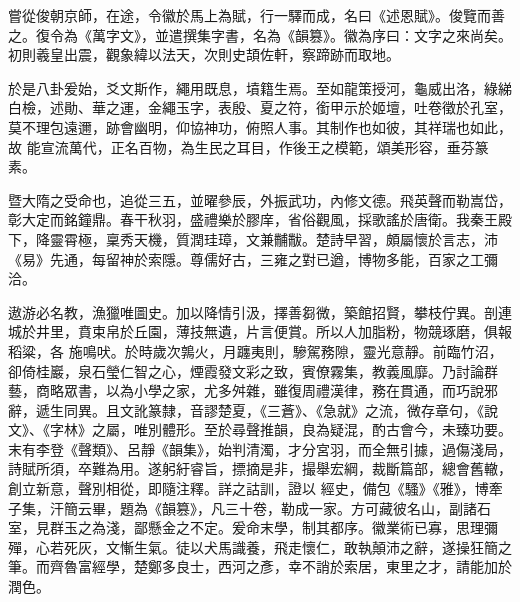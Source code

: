 \begin{pinyinscope}
 嘗從俊朝京師，在途，令徽於馬上為賦，行一驛而成，名曰《述恩賦》。俊覽而善之。復令為《萬字文》，並遣撰集字書，名為《韻篡》。徽為序曰：文字之來尚矣。初則羲皇出震，觀象緯以法天，次則史頡佐軒，察蹄跡而取地。



 於是八卦爰始，爻文斯作，繩用既息，墳籍生焉。至如龍策授河，龜威出洛，綠綈白檢，述勛、華之運，金繩玉字，表殷、夏之符，銜甲示於姬壇，吐卷徵於孔室，莫不理包遠邇，跡會幽明，仰協神功，俯照人事。其制作也如彼，其祥瑞也如此，故
 能宣流萬代，正名百物，為生民之耳目，作後王之模範，頌美形容，垂芬篆素。



 暨大隋之受命也，追從三五，並曜參辰，外振武功，內修文德。飛英聲而勒嵩岱，彰大定而銘鐘鼎。春干秋羽，盛禮樂於膠庠，省俗觀風，採歌謠於唐衛。我秦王殿下，降靈霄極，稟秀天機，質潤珪璋，文兼黼黻。楚詩早習，頗屬懷於言志，沛《易》先通，每留神於索隱。尊儒好古，三雍之對已遒，博物多能，百家之工彌洽。



 遨游必名教，漁獵唯圖史。加以降情引汲，擇善芻微，築館招賢，攀枝佇異。剖連城於井里，賁束帛於丘園，薄技無遺，片言便賞。所以人加脂粉，物競琢磨，俱報稻粱，各
 施鳴吠。於時歲次鶉火，月躔夷則，驂駕務隙，靈光意靜。前臨竹沼，卻倚桂巖，泉石瑩仁智之心，煙霞發文彩之致，賓僚霧集，教義風靡。乃討論群藝，商略眾書，以為小學之家，尤多舛雜，雖復周禮漢律，務在貫通，而巧說邪辭，遞生同異。且文訛篆隸，音謬楚夏，《三蒼》、《急就》之流，微存章句，《說文》、《字林》之屬，唯別體形。至於尋聲推韻，良為疑混，酌古會今，未臻功要。末有李登《聲類》、呂靜《韻集》，始判清濁，才分宮羽，而全無引據，過傷淺局，詩賦所須，卒難為用。遂躬紆睿旨，摽摘是非，撮舉宏綱，裁斷篇部，總會舊轍，創立新意，聲別相從，即隨注釋。詳之詁訓，證以
 經史，備包《騷》《雅》，博牽子集，汗簡云畢，題為《韻篡》，凡三十卷，勒成一家。方可藏彼名山，副諸石室，見群玉之為淺，鄙懸金之不定。爰命末學，制其都序。徽業術已寡，思理彌殫，心若死灰，文慚生氣。徒以犬馬識養，飛走懷仁，敢執顛沛之辭，遂操狂簡之筆。而齊魯富經學，楚鄭多良士，西河之彥，幸不誚於索居，東里之才，請能加於潤色。




\end{pinyinscope}

